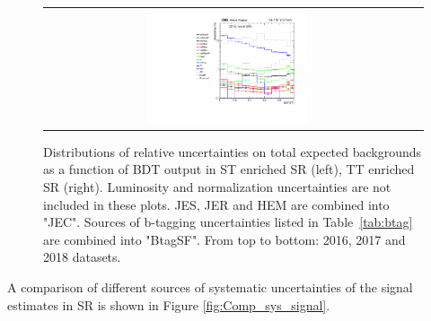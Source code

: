 \begin{figure}[tbh!]
\begin{center}
\begin{tabular}{cc}
  \includegraphics[width=0.45\textwidth]{figures/Part3/Systematics/sysBDT_TT_bkg_2018} \\
 \end{tabular}
 \caption{Distributions of relative uncertainties on total expected backgrounds as a function of BDT output in ST enriched SR (left), TT enriched SR (right). Luminosity and normalization uncertainties are not included in these plots. JES, JER and HEM are combined into "JEC". Sources of b-tagging uncertainties listed in Table~\ref{tab:btag} are combined into "BtagSF". From top to bottom: 2016, 2017 and 2018 datasets.}
 \label{fig:Comp_sys_background}
 \end{center}
\end{figure}

 A comparison of different sources of systematic uncertainties of the signal estimates in SR is shown in Figure \ref{fig:Comp_sys_signal}.


